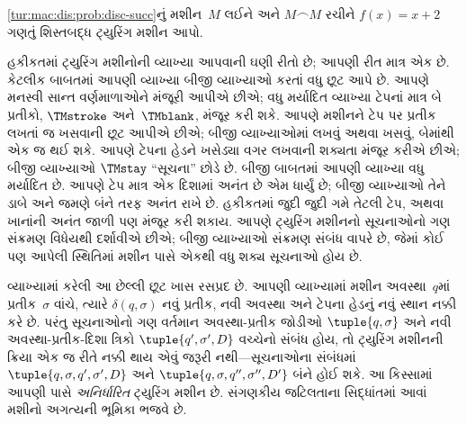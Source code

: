 \begin{prob}
    \cref{tur:mac:dis:prob:disc-succ}નું મશીન~$M$
    લઈને અને $M \frown M$ રચીને $f(x) = x+2$
    ગણતું શિસ્તબદ્ધ ટ્યુરિંગ મશીન આપો.
\end{prob}
\endgroup


\begingroup
\makeatletter{}\makeatother

\label{guunit:OLP-0262}


હકીકતમાં ટ્યુરિંગ મશીનોની વ્યાખ્યા આપવાની ઘણી રીતો છે;
આપણી રીત માત્ર એક છે. કેટલીક બાબતમાં આપણી વ્યાખ્યા
બીજી વ્યાખ્યાઓ કરતાં વધુ છૂટ આપે છે. આપણે મનસ્વી
સાન્ત વર્ણમાળાઓને મંજૂરી આપીએ છીએ; વધુ મર્યાદિત
વ્યાખ્યા ટેપનાં માત્ર બે પ્રતીકો, $\TMstroke$ અને~$\TMblank$,
મંજૂર કરી શકે. આપણે મશીનને ટેપ પર પ્રતીક લખતાં જ
ખસવાની છૂટ આપીએ છીએ; બીજી વ્યાખ્યાઓમાં લખવું
અથવા ખસવું, બેમાંથી એક જ થઈ શકે. આપણે ટેપના હેડને
ખસેડ્યા વગર લખવાની શક્યતા મંજૂર કરીએ છીએ; બીજી
વ્યાખ્યાઓ $\TMstay$ ``સૂચના'' છોડે છે. બીજી બાબતમાં
આપણી વ્યાખ્યા વધુ મર્યાદિત છે. આપણે ટેપ માત્ર એક
દિશામાં અનંત છે એમ ધાર્યું છે; બીજી વ્યાખ્યાઓ તેને ડાબે
અને જમણે બંને તરફ અનંત રાખે છે. હકીકતમાં જુદી જુદી
ગમે તેટલી ટેપ, અથવા ખાનાંની અનંત જાળી પણ મંજૂર કરી
શકાય. આપણે ટ્યુરિંગ મશીનનો સૂચનાઓનો ગણ સંક્રમણ
વિધેયથી દર્શાવીએ છીએ; બીજી વ્યાખ્યાઓ સંક્રમણ સંબંધ
વાપરે છે, જેમાં કોઈ પણ આપેલી સ્થિતિમાં મશીન પાસે
એકથી વધુ શક્ય સૂચનાઓ હોય છે.

વ્યાખ્યામાં કરેલી આ છેલ્લી છૂટ ખાસ રસપ્રદ છે. આપણી
વ્યાખ્યામાં મશીન અવસ્થા~$q$માં પ્રતીક~$\sigma$ વાંચે,
ત્યારે $\delta(q, \sigma)$ નવું પ્રતીક, નવી અવસ્થા અને
ટેપના હેડનું નવું સ્થાન નક્કી કરે છે. પરંતુ સૂચનાઓનો
ગણ વર્તમાન અવસ્થા-પ્રતીક જોડીઓ $\tuple{q,
  \sigma}$ અને નવી અવસ્થા-પ્રતીક-દિશા ત્રિકો
$\tuple{q', \sigma',
  D}$ વચ્ચેનો સંબંધ હોય, તો ટ્યુરિંગ મશીનની ક્રિયા
એક જ રીતે નક્કી થાય એવું જરૂરી નથી---સૂચનાઓના
સંબંધમાં $\tuple{q,
  \sigma, q', \sigma', D}$ અને
$\tuple{q, \sigma, q'', \sigma'', D'}$ બંને હોઈ શકે.
આ કિસ્સામાં આપણી પાસે \emph{અનિર્ધારિત} ટ્યુરિંગ મશીન
છે. સંગણકીય જટિલતાના સિદ્ધાંતમાં આવાં મશીનો અગત્યની
ભૂમિકા ભજવે છે.

